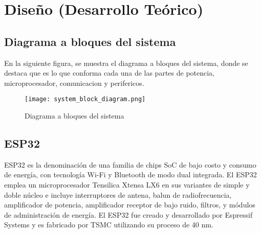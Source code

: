 


\section{Diseño (Desarrollo Teórico)}
\subsection{Diagrama a bloques del sistema}
En la siguiente figura, se muestra el diagrama a bloques del sistema, donde se destaca que es lo que
conforma cada una de las partes de potencia, microprocesador, comunicacion y perifericos.
\begin{figure}[htp]
    \centering
    \texttt{[image: system\_block\_diagram.png]}
    \caption{Diagrama a bloques del sistema}
\end{figure}

\subsection{ESP32}
ESP32 es la denominación de una familia de chips SoC de bajo costo y consumo de energía, con tecnología Wi-Fi
y Bluetooth de modo dual integrada. El ESP32 emplea un microprocesador Tensilica Xtensa LX6 en sus variantes
de simple y doble núcleo e incluye interruptores de antena, balun de radiofrecuencia, amplificador de potencia,
amplificador receptor de bajo ruido, filtros, y módulos de administración de energía. El ESP32 fue creado y
desarrollado por Espressif Systems y es fabricado por TSMC utilizando su proceso de 40 nm.


